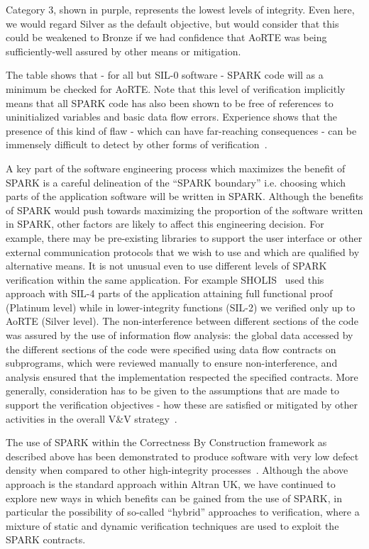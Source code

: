 \documentclass{llncs}
\begin{document}
Category 3, shown in purple, represents the lowest levels of integrity. Even
here, we would regard Silver as the default objective, but would consider that
this could be weakened to Bronze if we had confidence that AoRTE was being
sufficiently-well assured by other means or mitigation.

The table shows that - for all but SIL-0 software - SPARK code will as a
minimum be checked for AoRTE. Note that this level of verification implicitly
means that all SPARK code has also been shown to be free of references to
uninitialized variables and basic data flow errors.  Experience shows that the
presence of this kind of flaw - which can have far-reaching consequences - can
be immensely difficult to detect by other forms of
verification~\cite{King2000TSE}.

A key part of the software engineering process which maximizes the benefit of
SPARK is a careful delineation of the ``SPARK boundary'' i.e. choosing which
parts of the application software will be written in SPARK. Although the
benefits of SPARK would push towards maximizing the proportion of the software
written in SPARK, other factors are likely to affect this engineering
decision. For example, there may be pre-existing libraries to support the user
interface or other external communication protocols that we wish to use and
which are qualified by alternative means. It is not unusual even to use
different levels of SPARK verification within the same application. For example
SHOLIS~\cite{Croxford2005Manifesto} used this approach with SIL-4 parts of the
application attaining full functional proof (Platinum level) while in
lower-integrity functions (SIL-2) we verified only up to AoRTE (Silver level). 
The non-interference between different sections of the code was
assured by the use of information flow analysis: the global data accessed by
the different sections of the code were specified using data flow contracts on
subprograms, which were reviewed manually to ensure non-interference, and
analysis ensured that the implementation respected the specified contracts.
More generally, consideration has to be given to the assumptions that are made
to support the verification objectives - how these are satisfied or mitigated
by other activities in the overall V\&V strategy~\cite{kanig2014tap}.

The use of SPARK within the Correctness By Construction framework as described
above has been demonstrated to produce software with very low defect density
when compared to other high-integrity
processes~\cite{Croxford2005Manifesto}. Although the above approach is the
standard approach within Altran UK, we have continued to explore new ways in
which benefits can be gained from the use of SPARK, in particular the
possibility of so-called ``hybrid'' approaches to verification, where a mixture
of static and dynamic verification techniques are used to exploit the SPARK
contracts.
\end{document}
